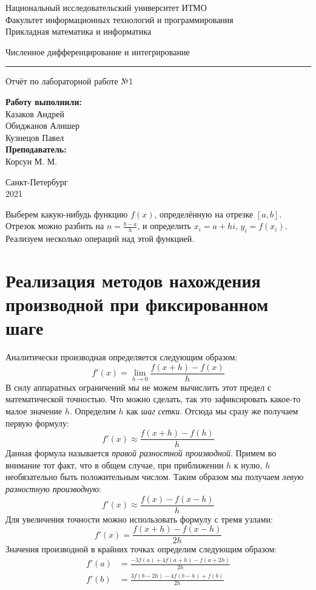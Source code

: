 \documentclass{article}
\begin{document}
\begin{center}
    Национальный исследовательский университет ИТМО \\
    Факультет информационных технологий и программирования \\
    Прикладная математика и информатика
\end{center}
\vspace{20em}
\begin{center}
    {\Large Численное дифференцирование и интегрирование}
    \vspace{3pt}
    \hrule
    \vspace{3pt}
    Отчёт по лабораторной работе №1
\end{center}
\vspace{20em}
\begin{flushright}
\textbf{ Работу выполнили: } \\
Казаков Андрей \\
Обиджанов Алишер \\
Кузнецов Павел \\
\vspace{1em}
\textbf{ Преподаватель: } \\
Корсун М. М.
\end{flushright}
\vspace{12em}
\begin{center}
    Санкт-Петербург \\
    2021
\end{center}
\newpage

Выберем какую-нибудь функцию $f(x)$, определённую на отрезке $[a, b]$.
Отрезок можно разбить на $n = \frac{b-a}{h}$, и определить $x_i = a + hi$, $y_i = f(x_i)$.
Реализуем несколько операций над этой функцией.

\section{Реализация методов нахождения производной при фиксированном шаге}

Аналитически производная определяется следующим образом:
$$f'(x)=\lim_{h \to 0} \frac{f(x+h)-f(x)}{h}$$
В силу аппаратных ограничений мы не можем вычислить этот предел с математической точностью.
Что можно сделать, так это зафиксировать какое-то малое значение $h$.
Определим $h$ как \textit{шаг сетки}. Отсюда мы сразу же получаем первую формулу:
$$f'(x) \approx \frac{f(x+h)-f(h)}{h}$$
Данная формула называется \textit{правой разностной производной}. Примем во внимание тот факт,
что в общем случае, при приближении $h$ к нулю, $h$ необязательно быть положительным числом.
Таким образом мы получаем \textit{левую разностную производную}:
$$f'(x) \approx \frac{f(x)-f(x-h)}{h}$$
Для увеличения точности можно использовать формулу с тремя узлами:
$$f'(x) = \frac{f(x+h) - f(x-h)}{2h}$$
Значения производной в крайних точках определим следующим образом:
\begin{align}
    f'(a) &= \frac{-3f(a) + 4f(a + h) - f(a + 2h)}{2h} \\
    f'(b) &= \frac{3f(b - 2h) - 4f(b - h) + f(b)}{2h}
\end{align}
\end{document}
